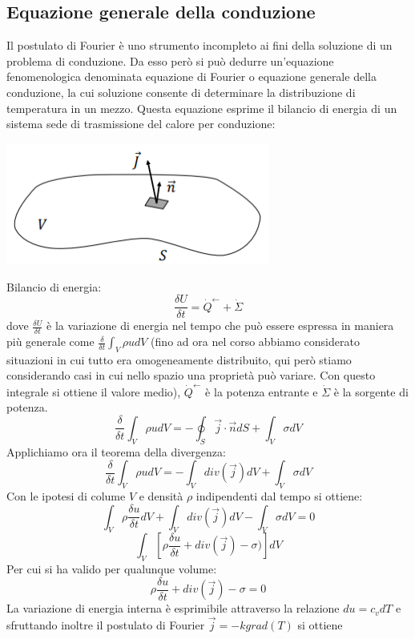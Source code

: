 \subsection{Equazione generale della conduzione}
Il postulato di Fourier è uno strumento incompleto ai fini della soluzione di un
problema di conduzione. Da esso però si può dedurre un'equazione
fenomenologica denominata equazione di Fourier o equazione generale della
conduzione, la cui soluzione consente di determinare la distribuzione di
temperatura in un mezzo. Questa equazione esprime il bilancio di energia di un
sistema sede di trasmissione del calore per conduzione:
\begin{center}
    \includegraphics[height=4cm]{../L10/img2.PNG}
\end{center}
Bilancio di energia:
\[
    \frac{\delta U}{\delta t} = \dot{Q}^\leftarrow + \dot{\Sigma}
\]
dove $\frac{\delta U}{\delta t}$ è la variazione di energia nel tempo che può essere espressa in maniera più generale come $\frac{\delta}{\delta t} \int_{V} \rho u d V$ (fino ad ora nel corso abbiamo considerato situazioni in cui tutto era omogeneamente distribuito, qui però stiamo considerando casi in cui nello spazio una proprietà può variare. Con questo integrale si ottiene il valore medio), $\dot{Q}^\leftarrow$ è la potenza entrante e $\dot{\Sigma}$ è la sorgente di potenza.
\[
    \frac{\delta}{\delta t} \int_{V} \rho u d V = - \oint_S \vec{j} \cdot  \vec{n} dS + \int_{V} \sigma dV
\]
Applichiamo ora il teorema della divergenza:
\[
    \frac{\delta}{\delta t} \int_{V} \rho u dV = - \int_{V} div(\vec{j}) dV + \int_{V} \sigma dV
\]
Con le ipotesi di colume $V$ e densità $\rho$ indipendenti dal tempo si ottiene:
\[
    \int_{V} \rho \frac{\delta u}{\delta t} dV + \int_{V} div(\vec{j}) dV - \int_{V} \sigma dV = 0
\]
\[
    \int_{V}\left[\rho \frac{\delta u}{\delta t} + div(\vec{j}) - \sigma)\right]dV
\]
Per cui si ha valido per qualunque volume:
\[
    \rho \frac{\delta u}{\delta t} + div(\vec{j}) - \sigma = 0
\]
La variazione di energia interna è esprimibile attraverso la relazione $du = c_v dT$ e sfruttando inoltre il postulato di Fourier $\vec{j} = - k grad (T)$ si ottiene
